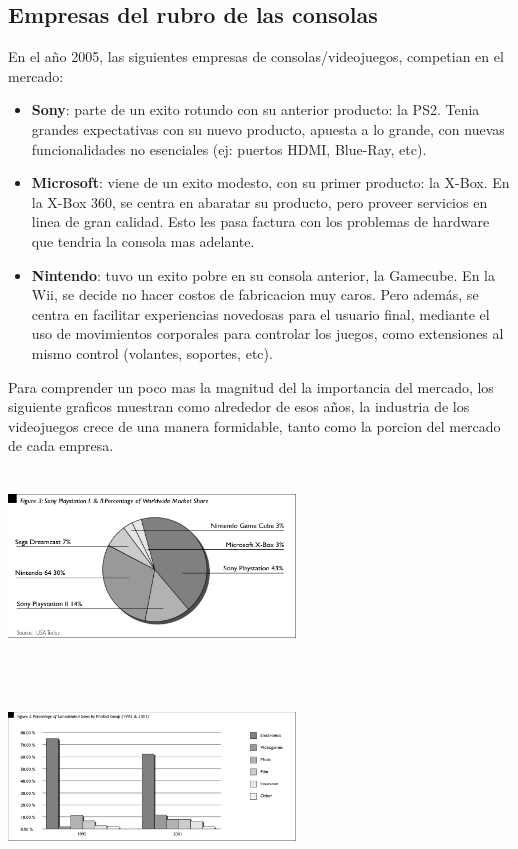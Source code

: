 \documentclass[11pt,compsoc]{IEEEtran}
\begin{document}
	\subsection{Empresas del rubro de las consolas}
	\noindent 
	En el año 2005, las siguientes empresas de consolas/videojuegos, competian en el mercado: 
		\begin{itemize}
		\item{{\bf{Sony}}: parte de un exito rotundo con su anterior producto: la PS2. Tenia grandes expectativas con su nuevo producto, apuesta a lo grande, con nuevas funcionalidades no esenciales (ej: puertos HDMI, Blue-Ray, etc).}
		
		\item{{\bf{Microsoft}}: viene de un exito modesto, con su primer producto: la X-Box. En la X-Box 360, se centra en abaratar su producto, pero proveer servicios en linea de gran calidad. Esto les pasa factura con los problemas de hardware que tendria la consola mas adelante.}
		
		\item{{\bf{Nintendo}}: tuvo un exito pobre en su consola anterior, la Gamecube. En la Wii, se decide no hacer costos de fabricacion muy caros. Pero además, se centra en facilitar experiencias novedosas para el usuario final, mediante el uso de movimientos corporales para controlar los juegos, como extensiones al mismo control (volantes, soportes, etc).}
		\end{itemize}
		
	Para comprender un poco mas la magnitud del la importancia del mercado, los siguiente graficos muestran como alrededor de esos años, la industria de los videojuegos crece de una manera formidable, tanto como la porcion del mercado de cada empresa.\\
	
	\begin{center}
		{\includegraphics[width=3in,height=2in,clip,keepaspectratio]{imgs/marketshare.png}}\newline
		
		
		{\includegraphics[width=3in,height=2in,clip,keepaspectratio]{imgs/gamingshare.png}}\newline
	\end{center}
	
\end{document}
